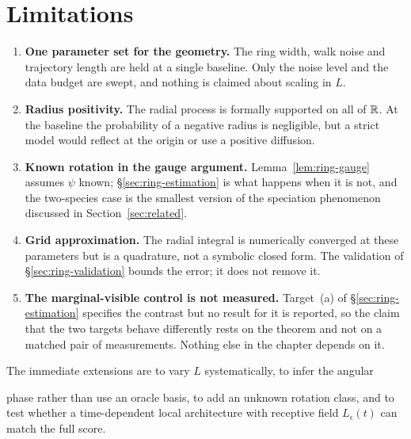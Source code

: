 \section{Limitations}\label{sec:ring-limits}

\begin{enumerate}
  \item \textbf{One parameter set for the geometry.} The ring width, walk noise
  and trajectory length are held at a single baseline. Only the noise level and
  the data budget are swept, and nothing is claimed about scaling in $L$.
  \item \textbf{Radius positivity.} The radial process is formally supported on
  all of $\mathbb{R}$. At the baseline the probability of a negative radius is
  negligible, but a strict model would reflect at the origin or use a positive
  diffusion.
  \item \textbf{Known rotation in the gauge argument.}
  Lemma~\ref{lem:ring-gauge} assumes $\psi$ known; \S\ref{sec:ring-estimation}
  is what happens when it is not, and the two-species case is the smallest
  version of the speciation phenomenon discussed in
  Section~\ref{sec:related}.
  \item \textbf{Grid approximation.} The radial integral is numerically
  converged at these parameters but is a quadrature, not a symbolic closed
  form. The validation of \S\ref{sec:ring-validation} bounds the error; it does
  not remove it.
  \item \textbf{The marginal-visible control is not measured.} Target~(a) of
  \S\ref{sec:ring-estimation} specifies the contrast but no result for it is
  reported, so the claim that the two targets behave differently rests on the
  theorem and not on a matched pair of measurements. Nothing else in the
  chapter depends on it.
\end{enumerate}

The immediate extensions are to vary $L$ systematically, to infer the angular

phase rather than use an oracle basis, to add an unknown rotation class, and to
test whether a time-dependent local architecture with receptive field
$L_\epsilon(t)$ can match the full score.
